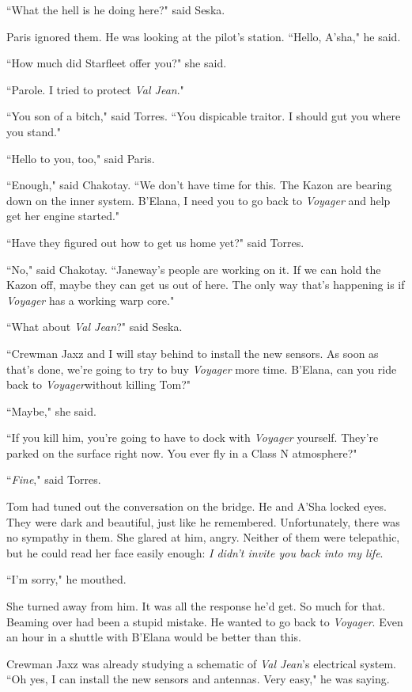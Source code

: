 \documentclass[twoside,letterpaper,12pt]{memoir}
\begin{document}
``What the hell is he doing here?" said Seska.

Paris ignored them. He was looking at the pilot’s station. ``Hello, A'sha," he said.

``How much did Starfleet offer you?" she said.

``Parole. I tried to protect \textit{Val Jean}."

``You son of a bitch," said Torres. ``You dispicable traitor. I should gut you where you stand."

``Hello to you, too," said Paris.

``Enough," said Chakotay. ``We don't have time for this. The Kazon are bearing down on the inner system. B'Elana, I need you to go back to \textit{Voyager} and help get her engine started."

``Have they figured out how to get us home yet?" said Torres.

``No," said Chakotay. ``Janeway's people are working on it. If we can hold the Kazon off, maybe they can get us out of here. The only way that's happening is if \textit{Voyager} has a working warp core."

``What about \textit{Val Jean}?" said Seska.

``Crewman Jaxz and I will stay behind to install the new sensors. As soon as that's done, we're going to try to buy \textit{Voyager} more time. B'Elana, can you ride back to \textit{Voyager}without killing Tom?"

``Maybe," she said.

``If you kill him, you're going to have to dock with \textit{Voyager} yourself. They're parked on the surface right now. You ever fly in a Class N atmosphere?"

``\textit{Fine}," said Torres.

Tom had tuned out the conversation on the bridge. He and A'Sha locked eyes. They were dark and beautiful, just like he remembered. Unfortunately, there was no sympathy in them. She glared at him, angry. Neither of them were telepathic, but he could read her face easily enough: \textit{I didn't invite you back into my life}.

``I'm sorry," he mouthed.

She turned away from him. It was all the response he'd get. So much for that. Beaming over had been a stupid mistake. He wanted to go back to \textit{Voyager}. Even an hour in a shuttle with B'Elana would be better than this.

Crewman Jaxz was already studying a schematic of \textit{Val Jean}'s electrical system. ``Oh yes, I can install the new sensors and antennas. Very easy," he was saying.
\end{document}
